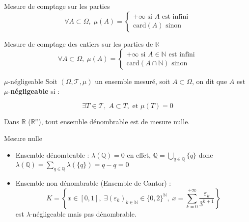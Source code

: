 \begin{Example}{Mesure de comptage sur les parties}{}
\begin{equation}
  \forall A \subset \Omega, \; \mu(A) = \begin{cases}
  + \infty \text{ si } A \text{ est infini} \\ 
  \mathrm{card}(A) \text{ sinon }
  \end{cases}
\end{equation}
\end{Example}

\begin{Example}{Mesure de comptage des entiers sur les parties de $\mathbb{R}$}{}
\begin{equation}
  \forall A \subset \Omega, \; \mu(A) = \begin{cases}
  + \infty \text{ si } A \in \mathbb{N} \text{ est infini} \\ 
  \mathrm{card}(A \cap \mathbb{N}) \text{ sinon }
  \end{cases}
\end{equation}
\end{Example}




\begin{Definition}[colbacktitle=red!75!black]{$\mu$-négligeable}{}
Soit $(\Omega, \mathcal{T}, \mu)$ un ensemble mesuré, soit $A \subset \Omega$, on dit que $A$ est $\mu$-\textbf{négligeable} si :

\begin{equation}
  \exists T \in \mathcal{T}, \; A \subset T, \text{ et } \mu(T) = 0
\end{equation}
\end{Definition}


\begin{Prop}{}{}
Dans $\mathbb{R}$ ($\mathbb{R} ^{n}$), tout ensemble dénombrable est de mesure nulle. 
\end{Prop}


\begin{Example}{Mesure nulle}{}
\begin{itemize}

    \item Ensemble dénombrable : $\lambda ( \mathbb{Q}) = 0$ en effet, $\mathbb{Q} = \bigcup _{q \in \mathbb{Q}} \{q\}$ donc $\lambda(\mathbb{Q}) = \sum_{q \in \mathbb{Q}}^{}\lambda(\{q\}) = q-q =0$
    \item Ensemble non dénombrable (Ensemble de Cantor) : 
      \begin{equation}
        K = \left\{ x \in [0,1], \; \exists (\varepsilon_k) _{k \in \mathbb{N}} \in \{0, 2 \} ^{\mathbb{N}}, \; x = \sum_{k=0}^{ + \infty} \frac{\varepsilon_k}{3 ^{k+1}} \right\}
      \end{equation}
      est $\lambda$-négligeable mais pas dénombrable.
\end{itemize}
\end{Example}




